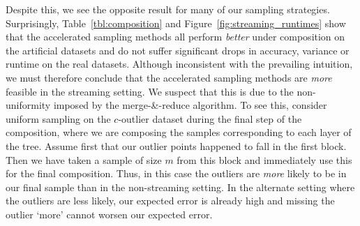 Despite this, we see the opposite result for many of our sampling strategies. Surprisingly, Table~\ref{tbl:composition} and Figure~\ref{fig:streaming_runtimes}
show that the accelerated sampling methods all perform \emph{better} under composition on the artificial datasets and do not suffer significant drops in
accuracy, variance or runtime on the real datasets. Although inconsistent with the prevailing intuition, we must therefore conclude that the accelerated
sampling methods are \emph{more} feasible in the streaming setting.  We suspect that this is due to the non-uniformity imposed by the merge-\&-reduce algorithm.
To see this, consider uniform sampling on the $c$-outlier dataset during the final step of the composition, where we are composing the samples corresponding to
each layer of the tree. Assume first that our outlier points happened to fall in the first block. Then we have taken a sample of size $m$ from this block and
immediately use this for the final composition. Thus, in this case the outliers are \emph{more} likely to be in our final sample than in the non-streaming
setting. In the alternate setting where the outliers are less likely, our expected error is already high and missing the outlier `more' cannot worsen our
expected error. 
